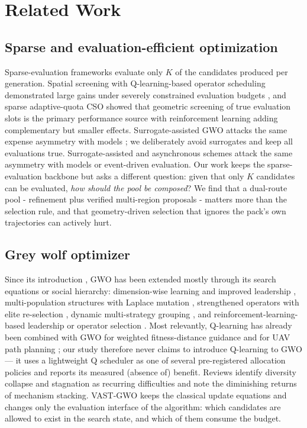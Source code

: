 \documentclass[journal]{IEEEtran}
\newcommand{\method}{VAST-GWO}
\begin{document}
\section{Related Work}
\subsection{Sparse and evaluation-efficient optimization}
Sparse-evaluation frameworks evaluate only $K$ of the candidates produced per
generation. Spatial screening with Q-learning-based operator scheduling
demonstrated large gains under severely constrained evaluation budgets
\cite{ssrlpso2026}, and sparse adaptive-quota CSO showed that geometric
screening of true evaluation slots is the primary performance source with
reinforcement learning adding complementary but smaller effects.
Surrogate-assisted GWO attacks the same expense asymmetry with models
\cite{dong2020surrogate}; we deliberately avoid surrogates and keep all
evaluations true. Surrogate-assisted and asynchronous
schemes attack the same asymmetry with models or event-driven evaluation.
Our work keeps the sparse-evaluation backbone but asks a different question:
given that only $K$ candidates can be evaluated, \emph{how should the pool be
composed}? We find that a dual-route pool - refinement plus verified
multi-region proposals - matters more than the selection rule, and that
geometry-driven selection that ignores the pack's own trajectories can
actively hurt.

\subsection{Grey wolf optimizer}
Since its introduction \cite{mirjalili2014gwo}, GWO has been extended mostly
through its search equations or social hierarchy: dimension-wise learning and
improved leadership \cite{nadimi2021igwo}, multi-population structures with
Laplace mutation \cite{wang2025dlmdgwo}, strengthened operators with elite
re-selection \cite{chen2025sgwo}, dynamic multi-strategy grouping
\cite{wang2026dmsgwo}, and reinforcement-learning-based leadership or
operator selection \cite{maleki2025rlgwo,yin2026amsrl}. Most relevantly,
Q-learning has already been combined with GWO for weighted fitness-distance
guidance and for UAV path planning \cite{huang2026qlfdgwo,nayeem2025qgwo};
our study therefore never claims to introduce Q-learning to GWO --- it uses
a lightweight Q scheduler as one of several pre-registered allocation
policies and reports its measured (absence of) benefit. Reviews identify diversity collapse and
stagnation as recurring difficulties and note the diminishing returns of
mechanism stacking. \method{} keeps the classical update equations and
changes only the evaluation interface of the algorithm: which candidates are
allowed to exist in the search state, and which of them consume the budget.
\end{document}
